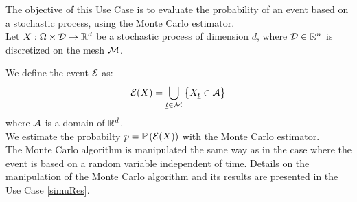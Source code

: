 \renewcommand{\filename}{docUC_StocProc_MonteCarlo.tex}
\renewcommand{\filetitle}{UC : Monte Carlo Probability of an event based on a process}

\HeaderIIILevel

\label{MonteCarloProcess}




The objective of this Use Case is to evaluate the probability of an event based on  a stochastic process, using the Monte Carlo estimator.\\


Let $X: \Omega \times {\mathcal D} \rightarrow {\mathbb R}^d$ be a stochastic process of dimension $d$, where ${\mathcal D} \in {\mathbb R}^n$ is discretized on the mesh ${\mathcal M}$.

We define the event ${\mathcal E}$ as:
\begin{align}\label{eventProcStoch}
  \displaystyle {\mathcal E}(X) = \bigcup_{{\underline{t}}\in {\mathcal M}}\left\{X_{{\underline{t}}}  \in {\mathcal A}  \right\}
\end{align}
where ${\mathcal A}$ is a domain of ${\mathbb R}^d$. \\

We estimate the probabilty $p={\mathbb P}\left( {\mathcal E}(X) \right)$ with the Monte Carlo estimator.\\

The Monte Carlo algorithm is manipulated the same way as in the case where the event is based on a random variable independent of time. Details on the manipulation of the Monte Carlo algorithm and its results are presented in the Use Case  \ref{simuRes}. \\


